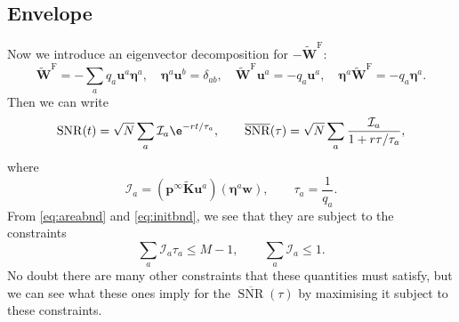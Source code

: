 \documentclass[12pt]{article}
\newcommand{\pr}{\mathbf{p}}
\newcommand{\eq}{\pr^\infty}
\newcommand{\w}{\mathbf{w}}
\newcommand{\W}{\mathbf{W}}
\newcommand{\enc}{\mathbf{K}}
\newcommand{\frgh}{\widetilde{\W}^{\mathrm{F}}}
\newcommand{\ench}{\widetilde{\enc}}
\newcommand{\evr}{\mathbf{u}}
\newcommand{\evl}{\boldsymbol{\eta}}
\DeclareMathOperator{\snr}{SNR}
\newcommand{\snrb}{\overline{\snr}}
\newcommand{\CI}{\mathcal{I}}
\begin{document}
\subsection{Envelope}\label{sec:envelope}

Now we introduce an eigenvector decomposition for $-\frgh$:
%
\begin{equation}\label{eq:eigendecomp}
  \frgh = - \sum_a q_a \evr^a \evl^a,
  \quad
  \evl^a \evr^b = \delta_{ab},
  \quad
  \frgh \evr^a = -q_a \evr^a,
  \quad
  \evl^a \frgh = -q_a \evl^a.
\end{equation}
%
Then we can write
%
\begin{equation}\label{eqsnreig}
  \snr(t) = \sqrt{N}\sum_a \CI_a \e^{-rt/\tau_a},
  \qquad
  \snrb(\tau) = \sqrt{N}\sum_a \frac{\CI_a}{1+r\tau/\tau_a},
\end{equation}
%
where
%
\begin{equation}\label{eq:snrcoeffs}
  \CI_a = (\eq \ench \evr^a) (\evl^a \w),
  \qquad
  \tau_a = \frac{1}{q_a}.
\end{equation}
%
From \eqref{eq:areabnd} and \eqref{eq:initbnd}, we see that they are subject to the constraints
%
\begin{equation}\label{eq:coeffconstr}
  \sum_a \CI_a \tau_a \leq M-1,
  \qquad
  \sum_a \CI_a \leq 1.
\end{equation}
%
No doubt there are many other constraints that these quantities must satisfy, but we can see what these ones imply for the $\snrb(\tau)$ by maximising it subject to these constraints.
\end{document}
